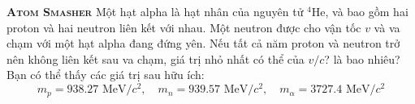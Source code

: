 \begin{problem}{\textbf{\textsc{Atom Smasher}}}
Một hạt alpha là hạt nhân của nguyên tử $^4\text{He}$, và bao gồm hai proton và hai neutron liên kết với nhau. Một neutron được cho vận tốc $v$ và va chạm với một hạt alpha đang đứng yên. Nếu tất cả năm proton và neutron trở nên không liên kết sau va chạm, giá trị nhỏ nhất có thể của $v/c$? là bao nhiêu? Bạn có thể thấy các giá trị sau hữu ích:
$$m_p = 938.27\text{ MeV}/c^2,\quad m_n = 939.57\text{ MeV}/c^2,\quad m_{\alpha} = 3727.4\text{ MeV}/c^2$$
\end{problem}